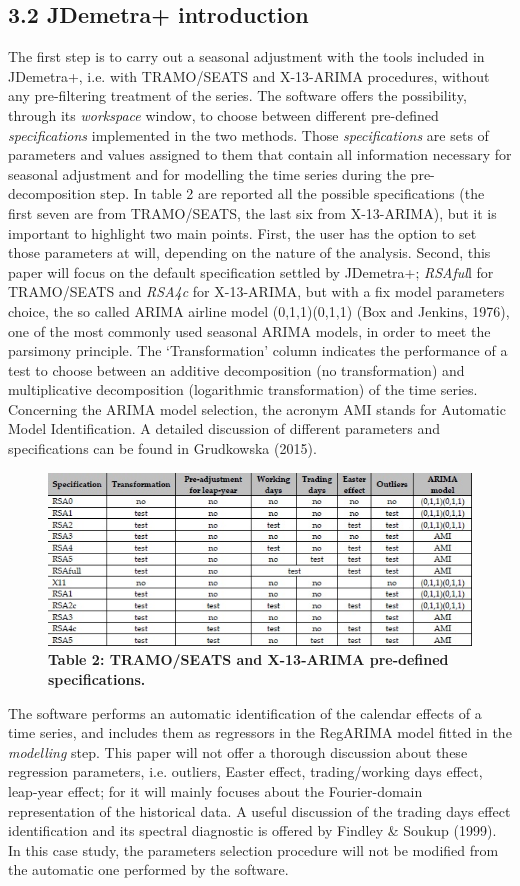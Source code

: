 \documentclass{article}
\begin{document}
\subsection*{\small 3.2 JDemetra+ introduction}
The first step is to carry out a seasonal adjustment with the tools included in JDemetra+, i.e. with TRAMO/SEATS and X-13-ARIMA procedures, without any pre-filtering treatment of the series. The software offers the possibility, through its \textit{workspace} window, to choose between different pre-defined \textit{specifications} implemented in the two methods. Those \textit{specifications} are sets of parameters and values assigned to them that contain all information necessary for seasonal adjustment and for modelling the time series during the pre-decomposition step. In table 2 are reported all the possible specifications (the first seven are from TRAMO/SEATS, the last six from X-13-ARIMA), but it is important to highlight two main points. First, the user has the option to set those parameters at will, depending on the nature of the analysis. Second, this paper will focus on the default specification settled by JDemetra+; \textit{RSAful}l for TRAMO/SEATS and \textit{RSA4c} for X-13-ARIMA, but with a fix model parameters choice, the so called ARIMA airline model (0,1,1)(0,1,1) (Box and Jenkins, 1976), one of the most commonly used seasonal ARIMA models, in order to meet the parsimony principle. The `Transformation' column indicates the performance of a test to choose between an additive decomposition (no transformation) and multiplicative decomposition (logarithmic transformation) of the time series. Concerning the ARIMA model selection, the acronym AMI stands for Automatic Model Identification. A detailed discussion of different parameters and specifications can be found in Grudkowska (2015).
\begin{figure}[H]
\centering
  \includegraphics[width=\linewidth]{../images/capitolo3/specification.jpg}
  {\textbf{\scriptsize Table 2: TRAMO/SEATS and X-13-ARIMA pre-defined specifications. }}
\end{figure}
The software performs an automatic identification of the calendar effects of a time series, and includes them as regressors in the RegARIMA model fitted in the \textit{modelling} step. This paper will not offer a thorough discussion about these regression parameters, i.e. outliers, Easter effect, trading/working days effect, leap-year effect; for it will mainly focuses about the Fourier-domain representation of the historical data. A useful discussion of the trading days effect identification and its spectral diagnostic is offered by Findley \& Soukup (1999). In this case study, the parameters selection procedure will not be modified from the automatic one performed by the software.
\end{document}
